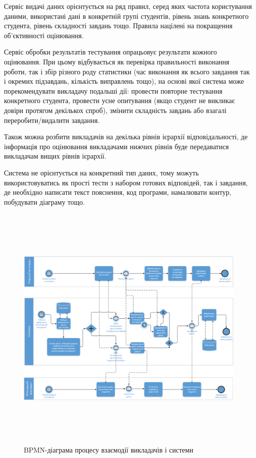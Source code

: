 Сервіс видачі даних орієнтується на ряд правил, серед яких частота користування
даними, використані дані в конкретній групі студентів, рівень знань конкретного
студента, рівень складності завдань тощо.
Правила націлені на покращення об’єктивності оцінювання.

Сервіс обробки результатів тестування опрацьовує результати кожного оцінювання.
При цьому відбувається як перевірка правильності виконання роботи, так і збір
різного роду статистики (час виконання як всього завдання так і окремих
підзавдань, кількість виправлень тощо), на основі якої система може
порекомендувати викладачу подальші дії: провести повторне тестування
конкретного студента, провести усне опитування (якщо студент не викликає довіри
протягом декількох спроб), змінити складність завдань або взагалі
переробити/видалити завдання.

Також можна розбити викладачів на декілька рівнів ієрархії відповідальності, де
інформація про оцінювання викладачами нижчих рівнів буде передаватися викладачам
вищих рівнів ієрархії.

Система не орієнтується на конкретний тип даних, тому можуть використовуватись
як прості тести з набором готових відповідей, так і завдання, де необхідно
написати текст пояснення, код програми, намалювати контур, побудувати діаграму
тощо.

\begin{figure}[htbp]
    \center\includegraphics[height=33em,angle=90]{images/bpmn_teachers.png}
    \caption{BPMN-діаграма процесу взаємодії викладачів і системи}
\end{figure}
